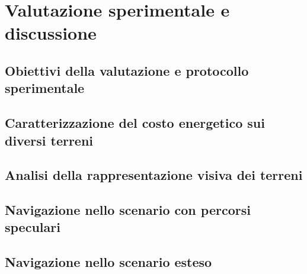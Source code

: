 \chapter{Valutazione sperimentale e discussione}
\label{chap:experiments}


\section{Obiettivi della valutazione e protocollo sperimentale}
\label{sec:esperimenti-protocollo}

\section{Caratterizzazione del costo energetico sui diversi terreni}
\label{sec:esperimenti-costo-terreni}

\section{Analisi della rappresentazione visiva dei terreni}
\label{sec:esperimenti-feature}

\section{Navigazione nello scenario con percorsi speculari}
\label{sec:esperimenti-speculari}

\section{Navigazione nello scenario esteso}
\label{sec:esperimenti-esteso}

